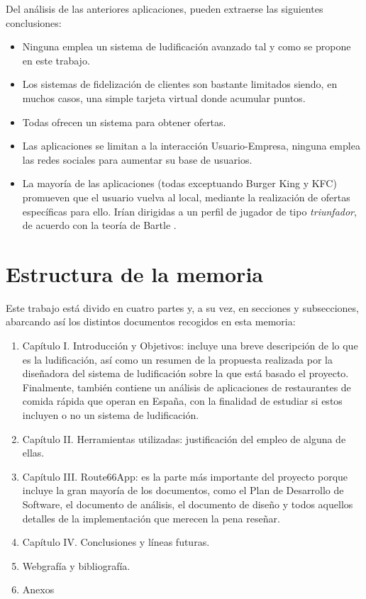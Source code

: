 \documentclass[twoside]{report}
\begin{document}
Del análisis de las anteriores aplicaciones, pueden extraerse las siguientes conclusiones:
\begin{itemize}

\item Ninguna emplea un sistema de ludificación avanzado tal y como se propone en este trabajo.

\item Los sistemas de fidelización de clientes son bastante limitados siendo, en muchos casos, una simple tarjeta virtual donde acumular puntos.

\item Todas ofrecen un sistema para obtener ofertas.

\item Las aplicaciones se limitan a la interacción Usuario-Empresa, ninguna emplea las redes sociales para aumentar su base de usuarios.

\item La mayoría de las aplicaciones (todas exceptuando Burger King y KFC) promueven que el usuario vuelva al local, mediante la realización de ofertas específicas para ello. Irían dirigidas a un perfil de jugador de tipo \textit{triunfador}, de acuerdo con la teoría de Bartle \cite{iebsctj}.
\end{itemize}

\section{Estructura de la memoria}

Este trabajo está divido en cuatro partes y, a su vez, en secciones y subsecciones, abarcando así los distintos documentos recogidos en esta memoria:

\begin{enumerate}
\item Capítulo I. Introducción y Objetivos: incluye una breve descripción de lo que es la ludificación, así como un resumen de la propuesta realizada por la diseñadora del sistema de ludificación sobre la que está basado el proyecto. Finalmente, también contiene un análisis de aplicaciones de restaurantes de comida rápida que operan en España, con la finalidad de estudiar si estos incluyen o no un sistema de ludificación.

\item Capítulo II. Herramientas utilizadas: justificación del empleo de alguna de ellas. 

\item Capítulo III. Route66App: es la parte más importante del proyecto porque incluye la gran mayoría de los documentos, como el Plan de Desarrollo de Software, el documento de análisis, el documento de diseño y todos aquellos detalles de la implementación que merecen la pena reseñar.

\item Capítulo IV. Conclusiones y líneas futuras.

\item Webgrafía y bibliografía.

\item Anexos

\end{enumerate}
\end{document}
